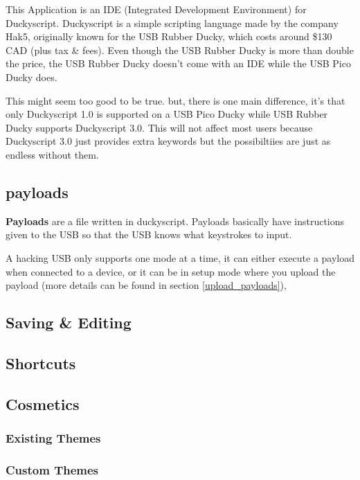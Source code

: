 \documentclass[a4paper,12pt]{article}
\begin{document}
This Application is an IDE (Integrated Development Environment) for Duckyscript. Duckyscript is a simple scripting language made by the company Hak5, originally known for the USB Rubber Ducky, which costs around \$130 CAD (plus tax \& fees).
Even though the USB Rubber Ducky is more than double the price, the USB Rubber Ducky doesn't come with an IDE while the USB Pico Ducky does.

This might seem too good to be true. but, there is one main difference,
it's that only Duckyscript 1.0 is supported on a USB Pico Ducky while USB Rubber Ducky supports Duckyscript 3.0. This will not affect most users because Duckyscript 3.0 just provides extra keywords but the possibiltiies are just as endless without them.

\subsection{payloads}

\textbf{Payloads} are a file written in duckyscript. Payloads basically have instructions given to the USB so that the USB knows what keystrokes to input.

A hacking USB only supports one mode at a time, it can either execute a payload when connected to a device, or it can be in setup mode where you upload the payload (more details can be found in section \ref{upload_payloads}), 

\subsection{Saving \& Editing}\label{save_edit}

\subsection{Shortcuts}

\subsection{Cosmetics}

\subsubsection{Existing Themes}

\subsubsection{Custom Themes}
\end{document}
